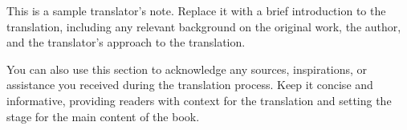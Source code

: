 This is a sample translator's note. Replace it with a brief introduction to the translation, including any relevant background on the original work, the author, and the translator's approach to the translation.

You can also use this section to acknowledge any sources, inspirations, or assistance you received during the translation process. Keep it concise and informative, providing readers with context for the translation and setting the stage for the main content of the book.

\vspace{1.5em}
